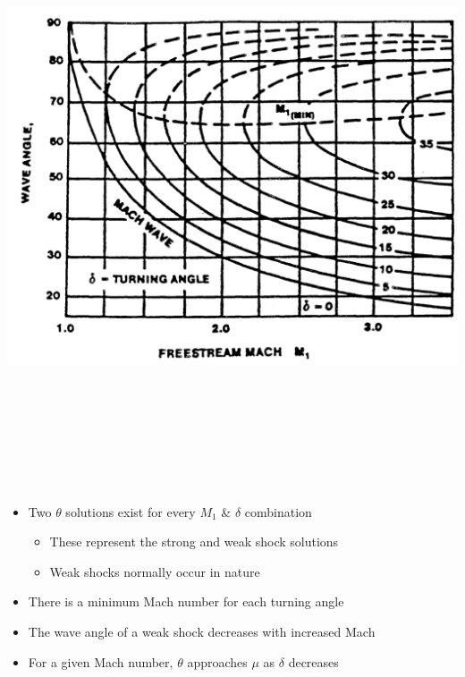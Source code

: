 \documentclass[
]{book}
\providecommand{\tightlist}{%
  \setlength{\itemsep}{0pt}\setlength{\parskip}{0pt}}
\begin{document}
\includegraphics[width=8.8in,height=7in]{media/05/image62.png}

\begin{itemize}
\tightlist
\item
  Two \(\theta\) solutions exist for every \(M_1\) \& \(\delta\) combination

  \begin{itemize}
  \tightlist
  \item
    These represent the strong and weak shock solutions
  \item
    Weak shocks normally occur in nature
  \end{itemize}
\item
  There is a minimum Mach number for each turning angle
\item
  The wave angle of a weak shock decreases with increased Mach
\item
  For a given Mach number, \(\theta\) approaches \(\mu\) as \(\delta\) decreases
\end{itemize}
\end{document}
